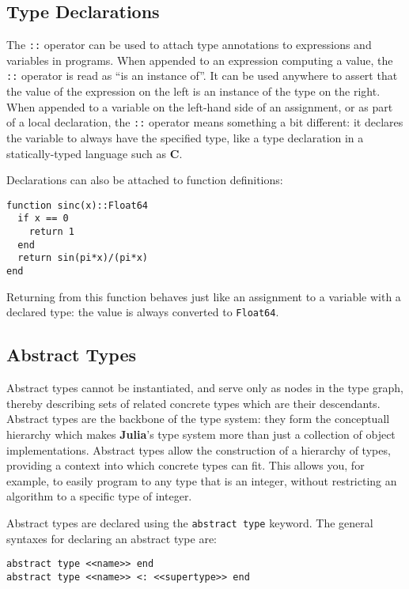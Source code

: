 \documentclass[
]{article}
\begin{document}
\hypertarget{type-declarations}{%
\subsection{Type Declarations}\label{type-declarations}}

The \texttt{::} operator can be used to attach type annotations to
expressions and variables in programs. When appended to an expression
computing a value, the \texttt{::} operator is read as ``is an instance
of''. It can be used anywhere to assert that the value of the expression
on the left is an instance of the type on the right. When appended to a
variable on the left-hand side of an assignment, or as part of a local
declaration, the \texttt{::} operator means something a bit different:
it declares the variable to always have the specified type, like a type
declaration in a statically-typed language such as \textbf{C}.

Declarations can also be attached to function definitions:

\begin{verbatim}
function sinc(x)::Float64
  if x == 0
    return 1
  end
  return sin(pi*x)/(pi*x)
end
\end{verbatim}

Returning from this function behaves just like an assignment to a
variable with a declared type: the value is always converted to
\texttt{Float64}.

\hypertarget{abstract-types}{%
\subsection{Abstract Types}\label{abstract-types}}

Abstract types cannot be instantiated, and serve only as nodes in the
type graph, thereby describing sets of related concrete types which are
their descendants. Abstract types are the backbone of the type system:
they form the conceptuall hierarchy which makes \textbf{Julia}'s type
system more than just a collection of object implementations. Abstract
types allow the construction of a hierarchy of types, providing a
context into which concrete types can fit. This allows you, for example,
to easily program to any type that is an integer, without restricting an
algorithm to a specific type of integer.

Abstract types are declared using the \texttt{abstract\ type} keyword.
The general syntaxes for declaring an abstract type are:

\begin{verbatim}
abstract type <<name>> end
abstract type <<name>> <: <<supertype>> end
\end{verbatim}
\end{document}
